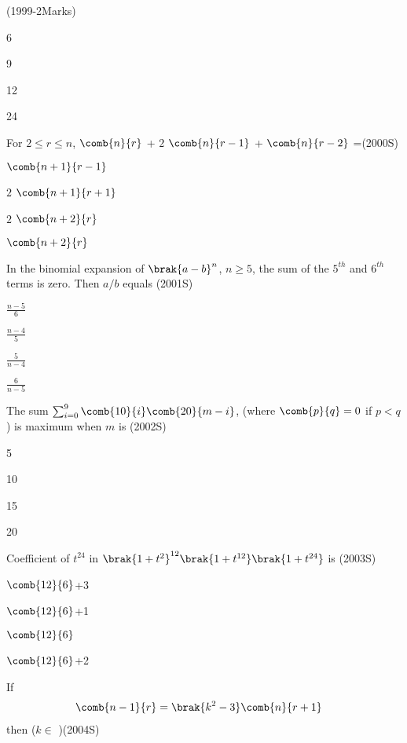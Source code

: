 \hfill(1999-2Marks)
\begin{enumerate}
\begin{multicols}{2}
    \item 6
    \item 9
    \item 12
    \item 24
    \end{multicols}
\end{enumerate}
\item For $2\leq r\leq n$, $\comb{n}{r}$ + $2$ $\comb{n}{r-1}$ + $\comb{n}{r-2}$ =\hfill(2000S)
\begin{enumerate}\begin{multicols}{2} 
    \item $\comb{n+1}{r-1}$ \item $2$ $\comb{n+1}{r+1}$
    \item $2$ $\comb{n+2}{r}$  \item $\comb{n+2}{r}$
    \end{multicols}
\end{enumerate}
\item In the binomial expansion of $\brak{a-b}^n$, $n\geq 5$, the sum of  the $5^{th}$ and $6^{th}$ terms is zero. Then $a/b$  equals
\hfill(2001S)
\begin{enumerate}
\begin{multicols}{2}
    \item $\frac{n-5}{6}$ 
    \item $\frac{n-4}{5}$
    \item $\frac{5}{n-4}$ 
    \item $\frac{6}{n-5}$
 \end{multicols}   
\end{enumerate}
\item The sum $\sum_{i=0}^{9} \comb{10}{i}\comb{20}{m-i}$, 
 (where $\comb{p}{q}=0$ if {
$p<q$)} is maximum when $m$ is \hfil(2002S)
\begin{enumerate}
\begin{multicols}{2}
    \item5 
    \item10
    \item15
    \item 20
    \end{multicols}
\end{enumerate}
\item Coefficient of $t^{24}$ in $\brak{{1+t^2}}^{12}\brak{1+t^{12}}\brak{1+t^{24}}$ is \hfill(2003S)
\begin{enumerate}
\begin{multicols}{2}
\item $\comb{12}{6}$+3
\item $\comb{12}{6}$+1 
\item $\comb{12}{6}$
\item $\comb{12}{6}$+2\end{multicols}
\end{enumerate}
\item If 
\begin{align}
\comb{n-1}{r} &= \brak{k^2-3} \comb{n}{r+1} \notag
\end{align}
then ($k \in $ )\hfill(2004S)

